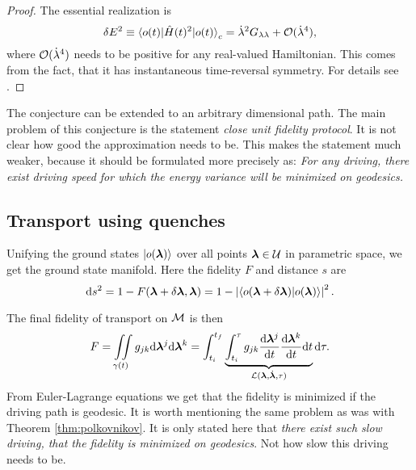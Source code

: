 \begin{proof}
    The essential realization is
    \begin{equation}
        \delta E^2\equiv \braket{o(t)|\hat{H}(t)^2|o(t)}_c=\dot\lambda^2 G_{\lambda\lambda}+\mathcal{O}(\dot\lambda^4),
    \end{equation}
    where $\mathcal{O}(\dot\lambda^4)$ needs to be positive for any real-valued Hamiltonian. This comes from the fact, that it has instantaneous time-reversal symmetry. For details see \cite{Bukov2019}.
\end{proof}

The conjecture can be extended to an arbitrary dimensional path. The main problem of this conjecture is the statement \emph{close unit fidelity protocol}. It is not clear how good the approximation needs to be. This makes the statement much weaker, because it should be formulated more precisely as: \emph{For any driving, there exist driving speed for which the energy variance will be minimized on geodesics.}









\subsection{Transport using quenches}
\label{sec:quenches}
Unifying the ground states $\ket{o({\bm\lambda})}$ over all points ${\bm\lambda}\in\mathcal U$ in parametric space, we get the ground state manifold. Here the fidelity $F$ and distance $s$ are
\begin{equation}
    \mathrm{d} s^2 = 1-F({\bm\lambda}+\delta{\bm\lambda},{\bm\lambda}) = 1-\left|\braket{o(\bm{{\bm\lambda}}+\delta\bm{{\bm\lambda}})|o(\bm{{\bm\lambda}})}\right|^2.
    \label{eq:distanceOnM0_1}
\end{equation}

The final fidelity of transport on $\mathcal{M}$ is then
\begin{equation}
    F=\iint\limits_{\gamma(t)} g_{jk}\mathrm{d}{\bm\lambda}^j\mathrm{d}{\bm\lambda}^k = \int_{t_i}^{t_f}\underbrace{\int_{t_i}^\tau g_{jk}\frac{\mathrm{d} {\bm\lambda}^j}{\mathrm{d} t}\frac{\mathrm{d} {\bm\lambda}^k}{\mathrm{d} t} \mathrm{d} t}_{\mathcal{L}({\bm\lambda},\dot{{\bm\lambda}},\tau)}\mathrm{d} \tau .
\end{equation}
From Euler-Lagrange equations we get that the fidelity is minimized if the driving path is geodesic. It is worth mentioning the same problem as was with Theorem \ref{thm:polkovnikov}. It is only stated here that \emph{there exist such slow driving, that the fidelity is minimized on geodesics}. Not how slow this driving needs to be. 

